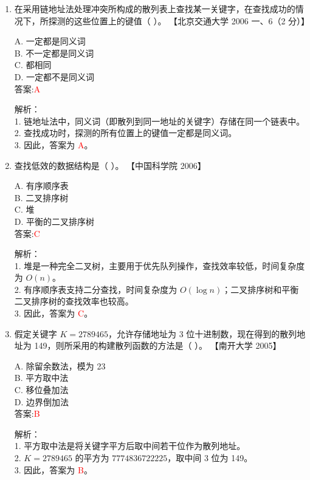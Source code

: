 \documentclass[lang=cn,newtx,10pt,scheme=chinese]{../../../elegantbook}
\begin{document}
\begin{enumerate}
\item 在采用链地址法处理冲突所构成的散列表上查找某一关键字，在查找成功的情况下，所探测的这些位置上的键值（ ）。  
    【北京交通大学 2006 一、6（2 分）】  

    A. 一定都是同义词 \\  
    B. 不一定都是同义词 \\  
    C. 都相同 \\  
    D. 一定都不是同义词 \\  

    答案:\textcolor{red}{A}

    解析：\\
    1. 链地址法中，同义词（即散列到同一地址的关键字）存储在同一个链表中。\\
    2. 查找成功时，探测的所有位置上的键值一定都是同义词。\\
    3. 因此，答案为 \textcolor{red}{A}。\\

\item 查找低效的数据结构是（ ）。  
    【中国科学院 2006】  

    A. 有序顺序表 \\  
    B. 二叉排序树 \\  
    C. 堆 \\  
    D. 平衡的二叉排序树 \\  

    答案:\textcolor{red}{C}

    解析：\\
    1. 堆是一种完全二叉树，主要用于优先队列操作，查找效率较低，时间复杂度为 $O(n)$。\\
    2. 有序顺序表支持二分查找，时间复杂度为 $O(\log n)$；二叉排序树和平衡二叉排序树的查找效率也较高。\\
    3. 因此，答案为 \textcolor{red}{C}。\\

\item 假定关键字 $K = 2 789 465$，允许存储地址为 3 位十进制数，现在得到的散列地址为 149，则所采用的构建散列函数的方法是（ ）。  
    【南开大学 2005】  

    A. 除留余数法，模为 23 \\  
    B. 平方取中法 \\  
    C. 移位叠加法 \\  
    D. 边界倒加法 \\  

    答案:\textcolor{red}{B}

    解析：\\
    1. 平方取中法是将关键字平方后取中间若干位作为散列地址。\\
    2. $K = 2 789 465$ 的平方为 $7 774 836 722 225$，取中间 3 位为 149。\\
    3. 因此，答案为 \textcolor{red}{B}。\\


\end{enumerate}
\end{document}
